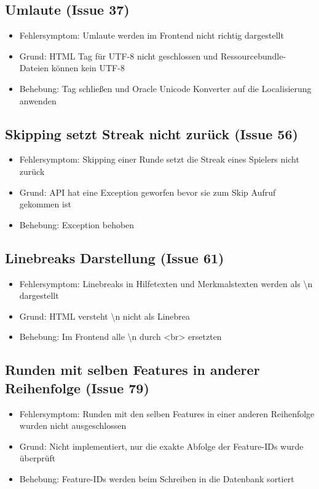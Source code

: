 \documentclass[a4paper]{scrreprt}
\begin{document}
    \subsection{Umlaute (Issue 37)}
    \begin{itemize}
        \item Fehlersymptom: Umlaute werden im Frontend nicht richtig dargestellt
        \item Grund: HTML Tag für UTF-8 nicht geschlossen und Ressourcebundle-Dateien können kein UTF-8 
        \item Behebung: Tag schließen und Oracle Unicode Konverter auf die Localisierung anwenden
    \end{itemize}
    \subsection{Skipping setzt Streak nicht zurück (Issue 56)}
    \begin{itemize}
        \item Fehlersymptom: Skipping einer Runde setzt die Streak eines Spielers nicht zurück
        \item Grund: API hat eine Exception geworfen bevor sie zum Skip Aufruf gekommen ist
        \item Behebung: Exception behoben
    \end{itemize}
    \subsection{Linebreaks Darstellung (Issue 61)}
    \begin{itemize}
    \item Fehlersymptom: Linebreaks in Hilfetexten und Merkmalstexten werden als \textbackslash n dargestellt
    \item Grund: HTML versteht \textbackslash n nicht als Linebrea
    \item Behebung: Im Frontend alle \textbackslash n durch <br> ersetzten
    \end{itemize}
    \subsection{Runden mit selben Features in anderer Reihenfolge (Issue 79)}
    \begin{itemize}
    \item Fehlersymptom: Runden mit den selben Features in einer anderen
     Reihenfolge wurden nicht ausgeschlossen
    \item Grund: Nicht implementiert, nur die exakte Abfolge der Feature-IDs wurde
     überprüft
    \item Behebung: Feature-IDs werden beim Schreiben in die Datenbank sortiert
    \end{itemize}
\end{document}
